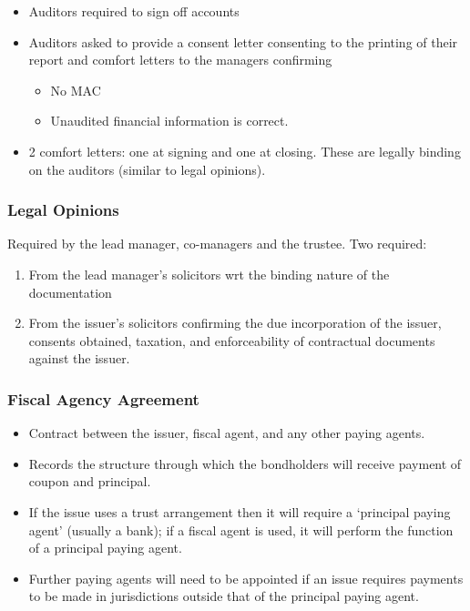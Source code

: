 \documentclass[
]{article}
\providecommand{\tightlist}{%
  \setlength{\itemsep}{0pt}\setlength{\parskip}{0pt}}
\begin{document}
\begin{itemize}
\tightlist
\item
  Auditors required to sign off accounts
\item
  Auditors asked to provide a consent letter consenting to the printing
  of their report and comfort letters to the managers confirming

  \begin{itemize}
  \tightlist
  \item
    No MAC
  \item
    Unaudited financial information is correct.
  \end{itemize}
\item
  2 comfort letters: one at signing and one at closing. These are
  legally binding on the auditors (similar to legal opinions).
\end{itemize}

\hypertarget{legal-opinions}{%
\subsubsection{Legal Opinions}\label{legal-opinions}}

Required by the lead manager, co-managers and the trustee. Two required:

\begin{enumerate}
\def\labelenumi{\arabic{enumi}.}
\tightlist
\item
  From the lead manager's solicitors wrt the binding nature of the
  documentation
\item
  From the issuer's solicitors confirming the due incorporation of the
  issuer, consents obtained, taxation, and enforceability of contractual
  documents against the issuer.
\end{enumerate}

\hypertarget{fiscal-agency-agreement}{%
\subsubsection{Fiscal Agency Agreement}\label{fiscal-agency-agreement}}

\begin{itemize}
\tightlist
\item
  Contract between the issuer, fiscal agent, and any other paying
  agents.
\item
  Records the structure through which the bondholders will receive
  payment of coupon and principal.
\item
  If the issue uses a trust arrangement then it will require a
  `principal paying agent' (usually a bank); if a fiscal agent is used,
  it will perform the function of a principal paying agent.
\item
  Further paying agents will need to be appointed if an issue requires
  payments to be made in jurisdictions outside that of the principal
  paying agent.
\end{itemize}
\end{document}
